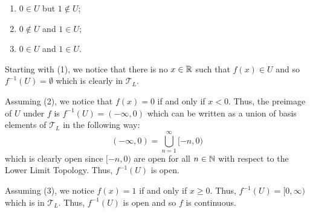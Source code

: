 \documentclass[a4paper]{article}
\begin{document}
\begin{problem}
\begin{enumerate}
\begin{solution}
\begin{enumerate}
                \item[(2)] \( 0 \in U \) but \( 1 \notin U  \);
                \item[(3)] \( 0 \notin U  \) and \( 1 \in U  \);
                \item[(4)] \( 0 \in U  \) and \( 1 \in U \).
           \end{enumerate}
           Starting with (1), we notice that there is no \( x \in \mathbb{R}  \) such that \( f(x) \in U  \) and so \( f^{-1}(U) = \emptyset \) which is clearly in \( \mathcal{T}_{L} \).  
           
           Assuming (2), we notice that \( f(x) = 0  \) if and only if \( x < 0  \). Thus, the preimage of \( U  \) under \( f  \) is \( f^{-1}(U) = (-\infty , 0 ) \) which can be written as a union of basis elements of \( \mathcal{T}_{L} \) in the following way:
           \[  (-\infty , 0) = \bigcup_{ n = 1  }^{ \infty   } [-n, 0) \]
           which is clearly open since \( [-n,0) \) are open for all \( n \in \mathbb{N}  \) with respect to the Lower Limit Topology. Thus, \( f^{-1}(U) \) is open.
            
           Assuming (3), we notice \( f(x) = 1  \) if and only if \( x \geq 0  \). Thus, \( f^{-1}(U) = [0,\infty) \) which is in \( \mathcal{T}_L \). Thus, \( f^{-1}(U) \) is open and so \( f \) is continuous.


\end{solution}
\end{enumerate}
\end{problem}
\end{document}
